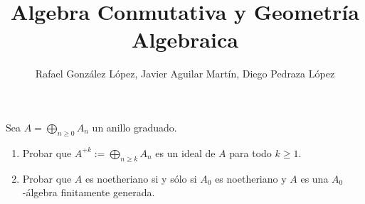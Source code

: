 \documentclass[twoside]{article}
\begin{document}
\title{Algebra Conmutativa y Geometría Algebraica}
\author{Rafael González López, Javier Aguilar Martín, Diego Pedraza López}
\maketitle

\begin{ejercicio}{1}
Sea $A = \bigoplus_{n≥0} A_n$ un anillo graduado.
\begin{enumerate}
	\item Probar que $A^{+k} := \bigoplus_{n≥k} A_n$ es un ideal de $A$ para todo $k ≥ 1$.
	\item Probar que $A$ es noetheriano si y sólo si $A_0$ es noetheriano y $A$ es una $A_0$-álgebra finitamente generada.
\end{enumerate}
\end{ejercicio}
\end{document}
